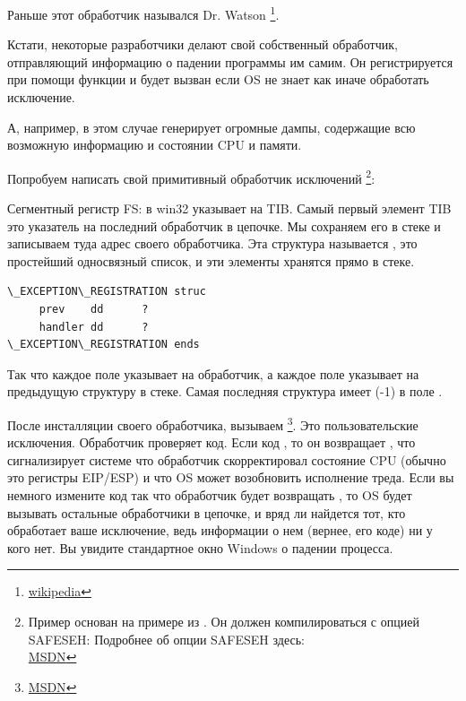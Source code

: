 Раньше этот обработчик назывался Dr. Watson
\footnote{\href{http://go.yurichev.com/17046}{wikipedia}}.

Кстати, некоторые разработчики делают свой собственный обработчик,
отправляющий информацию о падении программы им самим.
Он регистрируется при помощи функции  
и будет вызван если \ac{OS} не знает как иначе обработать исключение.

\myindex{\oracle}
А, например, \oracle в этом случае генерирует огромные дампы, 
содержащие всю возможную информацию и состоянии \ac{CPU} и памяти.

Попробуем написать свой примитивный обработчик исключений
\footnote{
	Пример основан на примере из \cite{PietrekSEH}.
	Он должен компилироваться с опцией SAFESEH: 
	Подробнее об опции SAFESEH здесь: \\
	\href{http://go.yurichev.com/17252}{MSDN}
}:
	


Сегментный регистр FS: в win32 указывает на \ac{TIB}.
Самый первый элемент \ac{TIB} это указатель на последний обработчик в цепочке.
Мы сохраняем его в стеке и записываем туда адрес своего обработчика.
Эта структура называется , 
это простейший односвязный список, и эти элементы хранятся прямо в стеке.

\begin{lstlisting}[caption=MSVC/VC/crt/src/exsup.inc]
\_EXCEPTION\_REGISTRATION struc
     prev    dd      ?
     handler dd      ?
\_EXCEPTION\_REGISTRATION ends
\end{lstlisting}

Так что каждое поле  указывает на обработчик,
а каждое поле  указывает на предыдущую структуру в стеке.
Самая последняя структура имеет  (-1) в поле .



После инсталляции своего обработчика, вызываем \footnote{\href{http://go.yurichev.com/17253}{MSDN}}.
Это пользовательские исключения. 
Обработчик проверяет код.
Если код , то он возвращает 
,
что сигнализирует системе что обработчик скорректировал состояние CPU (обычно это регистры EIP/ESP) и что \ac{OS} может
возобновить исполнение треда.
Если вы немного измените код так что обработчик будет возвращать ,
то \ac{OS} будет вызывать остальные
обработчики в цепочке, и вряд ли найдется тот, кто обработает ваше исключение,
ведь информации о нем (вернее, его коде) ни у кого нет.
Вы увидите стандартное окно Windows о падении процесса.

